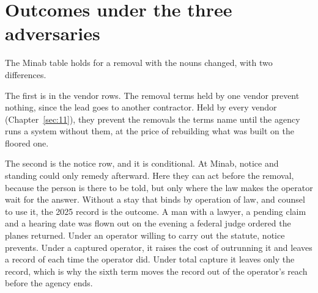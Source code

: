 \section{Outcomes under the three adversaries}
\label{sec:10.7}
The Minab table holds for a removal with the nouns changed, with two differences.

The first is in the vendor rows. The removal terms held by one vendor prevent nothing, since the lead goes to another contractor. Held by every vendor (Chapter~\ref{sec:11}), they prevent the removals the terms name until the agency runs a system without them, at the price of rebuilding what was built on the floored one.

The second is the notice row, and it is conditional. At Minab, notice and standing could only remedy afterward. Here they can act before the removal, because the person is there to be told, but only where the law makes the operator wait for the answer. Without a stay that binds by operation of law, and counsel to use it, the 2025 record is the outcome. A man with a lawyer, a pending claim and a hearing date was flown out on the evening a federal judge ordered the planes returned. Under an operator willing to carry out the statute, notice prevents. Under a captured operator, it raises the cost of outrunning it and leaves a record of each time the operator did. Under total capture it leaves only the record, which is why the sixth term moves the record out of the operator's reach before the agency ends.
